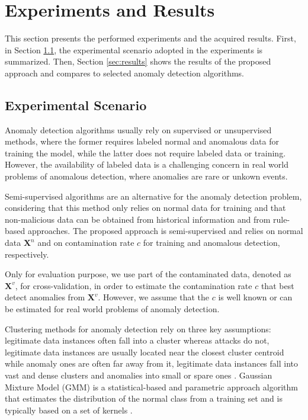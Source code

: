 \documentclass[review]{elsarticle}
\begin{document}
\section{Experiments and Results}
\label{sec:experimentalresults}

This section presents the performed experiments and the acquired results. First, in Section \ref{sec:AnalyzedScenario}, the experimental scenario adopted in the experiments is summarized. Then, Section \ref{sec:results} shows the results of the proposed approach and compares to selected anomaly detection algorithms.

\subsection{Experimental Scenario}
\label{sec:AnalyzedScenario}

Anomaly detection algorithms usually rely on supervised or unsupervised methods, where the former requires labeled normal and anomalous data for training the model, while the latter does not require labeled data or training. However, the availability of labeled data is a challenging concern in real world problems of anomalous detection, where anomalies are rare or unkown events. 

Semi-supervised algorithms are an alternative for the anomaly detection problem, considering that this method only relies on normal data for training and that non-malicious data can be obtained from historical information and from rule-based approaches. The proposed approach is semi-supervised and relies on normal data $\boldsymbol{X}^n$ and on contamination rate $c$ for training and anomalous detection, respectively.

Only for evaluation purpose, we use part of the contaminated data, denoted as $\textbf{X}^v$, for cross-validation, in order to estimate the contamination rate $c$ that best detect anomalies from $\textbf{X}^v$. However, we assume that the $c$ is well known or can be estimated for real world problems of anomaly detection.

Clustering methods for anomaly detection rely on three key assumptions: legitimate data instances often fall into a cluster whereas attacks do not, legitimate data instances are usually located near the closest cluster centroid while anomaly ones are often far away from it, legitimate data instances fall into vast and dense clusters and anomalies into small or spare ones \cite{ahmed2016survey, moustafa2019holistic}. Gaussian Mixture Model (GMM) is a statistical-based and parametric approach algorithm that estimates the distribution of the normal class from a training set and is typically based on a set of kernels \cite{moustafa2019holistic}.
\end{document}
